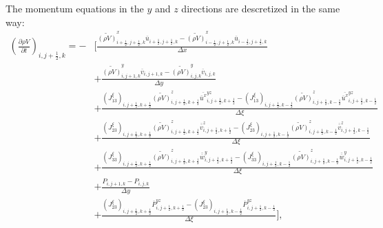 The momentum equations in the $y$ and $z$ directions are descretized 
in the same way:
\begin{align}
 \left(\frac{\partial \rho V}{\partial t}\right)_{i,j+\frac{1}{2},k}
 = - &\Bigg[ \frac{ \widetilde{(\rho V)}^x_{i+\frac{1}{2},j+\frac{1}{2},k} \overline{u}_{i+\frac{1}{2},j+\frac{1}{2},k}
                  - \widetilde{(\rho V)}^x_{i-\frac{1}{2},j+\frac{1}{2},k} \overline{u}_{i-\frac{1}{2},j+\frac{1}{2},k}
                  } {\Delta x} \nonumber \\
          &+ \frac{ \widetilde{(\rho V)}^y_{i,j+1,k} \overline{v}_{i,j+1,k}
                  - \widetilde{(\rho V)}^y_{i,j  ,k} \overline{v}_{i,j  ,k}
                  } {\Delta y} \nonumber \\
          &+ \frac{ (J^{\xi}_{13})_{i,j+\frac{1}{2},k+\frac{1}{2}} \widetilde{(\rho V)}^z_{i,j+\frac{1}{2},k+\frac{1}{2}} \overline{\overline{u}^x}^{yz}_{i,j+\frac{1}{2},k+\frac{1}{2}}
                  - (J^{\xi}_{13})_{i,j+\frac{1}{2},k-\frac{1}{2}} \widetilde{(\rho V)}^z_{i,j+\frac{1}{2},k-\frac{1}{2}} \overline{\overline{u}^x}^{yz}_{i,j+\frac{1}{2},k-\frac{1}{2}}
                  } {\Delta \xi} \nonumber \\
          &+ \frac{ (J^{\xi}_{23})_{i,j+\frac{1}{2},k+\frac{1}{2}} \widetilde{(\rho V)}^z_{i,j+\frac{1}{2},k+\frac{1}{2}} \overline{\overline{v}}^z_{i,j+\frac{1}{2},k+\frac{1}{2}}
                  - (J^{\xi}_{23})_{i,j+\frac{1}{2},k-\frac{1}{2}} \widetilde{(\rho V)}^z_{i,j+\frac{1}{2},k-\frac{1}{2}} \overline{\overline{v}}^z_{i,j+\frac{1}{2},k-\frac{1}{2}}
                  } {\Delta \xi} \nonumber \\
          &+ \frac{ (J^{\xi}_{33})_{i,j+\frac{1}{2},k+\frac{1}{2}} \widetilde{(\rho V)}^z_{i,j+\frac{1}{2},k+\frac{1}{2}} \overline{\overline{w}}^y_{i,j+\frac{1}{2},k+\frac{1}{2}}
                  - (J^{\xi}_{33})_{i,j+\frac{1}{2},k-\frac{1}{2}} \widetilde{(\rho V)}^z_{i,j+\frac{1}{2},k-\frac{1}{2}} \overline{\overline{w}}^y_{i,j+\frac{1}{2},k-\frac{1}{2}}
                  } {\Delta \xi} \nonumber \\
          &+ \frac{ P_{i,j+1,k}-P_{i,j,k}}{\Delta y} \nonumber \\
          &+ \frac{ (J^{\xi}_{23})_{i,j+\frac{1}{2},k+\frac{1}{2}} \overline{P}^{yz}_{i,j+\frac{1}{2},k+\frac{1}{2}}
                  - (J^{\xi}_{23})_{i,j+\frac{1}{2},k-\frac{1}{2}} \overline{P}^{yz}_{i,j+\frac{1}{2},k-\frac{1}{2}}
                  } {\Delta \xi} \Bigg],
\end{align}

